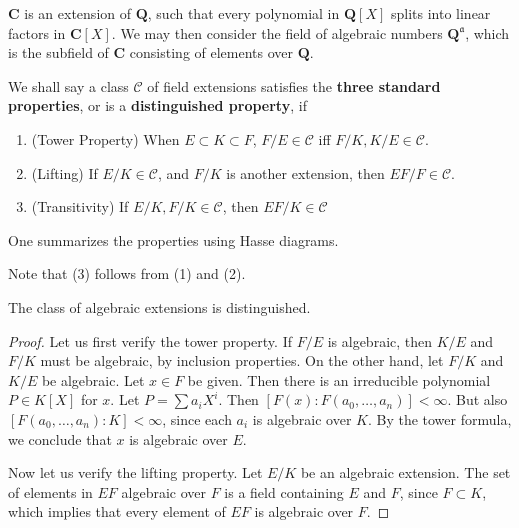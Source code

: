 \begin{example}
    $\mathbf{C}$ is an extension of $\mathbf{Q}$, such that every polynomial in $\mathbf{Q}[X]$ splits into linear factors in $\mathbf{C}[X]$. We may then consider the field of algebraic numbers $\mathbf{Q}^{\mathfrak{a}}$, which is the subfield of $\mathbf{C}$ consisting of elements over $\mathbf{Q}$.
\end{example}

We shall say a class $\mathcal{C}$ of field extensions satisfies the {\bf three standard properties}, or is a {\bf distinguished property}, if
%
\begin{enumerate}
    \item (Tower Property) When $E \subset K \subset F$, $F/E \in \mathcal{C}$ iff $F/K,K/E \in \mathcal{C}$.
    \item (Lifting) If $E/K \in \mathcal{C}$, and $F/K$ is another extension, then $EF/F \in \mathcal{C}$.
    \item (Transitivity) If $E/K, F/K \in \mathcal{C}$, then $EF/K \in \mathcal{C}$
\end{enumerate}
%
One summarizes the properties using Hasse diagrams.
%
\begin{center}
\end{center}
%
Note that (3) follows from (1) and (2).

\begin{theorem}
    The class of algebraic extensions is distinguished.
\end{theorem}
\begin{proof}
    Let us first verify the tower property. If $F/E$ is algebraic, then $K/E$ and $F/K$ must be algebraic, by inclusion properties. On the other hand, let $F/K$ and $K/E$ be algebraic. Let $x \in F$ be given. Then there is an irreducible polynomial $P \in K[X]$ for $x$. Let $P = \sum a_i X^i$. Then $[F(x): F(a_0, \dots, a_n)] < \infty$. But also $[F(a_0, \dots, a_n): K] < \infty$, since each $a_i$ is algebraic over $K$. By the tower formula, we conclude that $x$ is algebraic over $E$.

    Now let us verify the lifting property. Let $E/K$ be an algebraic extension. The set of elements in $EF$ algebraic over $F$ is a field containing $E$ and $F$, since $F \subset K$, which implies that every element of $EF$ is algebraic over $F$.
\end{proof}

